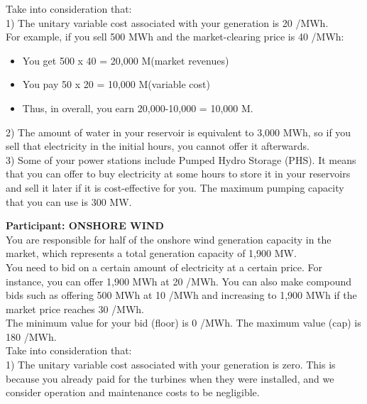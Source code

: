 \documentclass[3p]{elsarticle} %
\begin{document}
Take into consideration that: \\

1)	The unitary variable cost associated with your generation is 20 \EUR/MWh. \\

For example, if you sell 500 MWh and the market-clearing price is 40 \EUR/MWh:

\begin{itemize}
\item You get 500 x 40 = 20,000 M\EUR (market revenues)
\item You pay 50 x 20 = 10,000 M\EUR (variable cost)
\item Thus, in overall, you earn 20,000-10,000 = 10,000 M\EUR.
\end{itemize}

2)	The amount of water in your reservoir is equivalent to 3,000 MWh, so if you sell that electricity in the initial hours, you cannot offer it afterwards.\\

3)	Some of your power stations include Pumped Hydro Storage (PHS). It means that you can offer to buy electricity at some hours to store it in your reservoirs and sell it later if it is cost-effective for you. The maximum pumping capacity that you can use is 300 MW.

\newpage

\textbf{Participant: ONSHORE WIND} \\

You are responsible for half of the onshore wind generation capacity in the market, which represents a total generation capacity of 1,900 MW. \\

You need to bid on a certain amount of electricity at a certain price. For instance, you can offer 1,900 MWh at 20 \EUR/MWh. You can also make compound bids such as offering 500 MWh at 10 \EUR/MWh and increasing to 1,900 MWh if the market price reaches 30 \EUR/MWh. \\

The minimum value for your bid (floor) is 0 \EUR/MWh. The maximum value (cap) is 180 \EUR/MWh. \\

Take into consideration that: \\

1)	The unitary variable cost associated with your generation is zero. This is because you already paid for the turbines when they were installed, and we consider operation and maintenance costs to be negligible. \\
\end{document}
